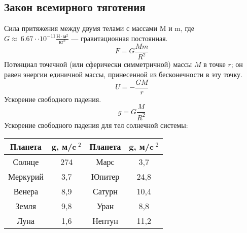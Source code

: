 \subsection{Закон всемирного тяготения}
Сила притяжения между двумя телами с массами M и m, где $G\approx\ 6.67\cdot \cdot10^{-11}\frac{\text{Н}\cdot \text{м}^2}{\text{кг}^2}$ --- гравитационная постоянная.$$F=G\frac{Mm}{R^2}$$
Потенциал точечной (или сферически симметричной) массы $M$ в точке $r$; он равен энергии единичной массы, принесенной из бесконечности в эту точку.$$U=-\frac{GM}{r}$$
Ускорение свободного падения.$$g=G\frac{M}{R^2}$$
Ускорение свободного падения для тел солнечной системы:
\begin{table}[h!]
\centering
\begin{tabular}{|c|c|c|c|}
\hline 
\textbf{Планета} & $\mathbf{g}$, \textbf{м/c$~^2$} & \textbf{Планета} & $\mathbf{g}$, \textbf{м/c$~^2$}\\
\hline
Солнце & 274 & Марс & 3,7\\
\hline
Меркурий & 3,7 & Юпитер & 24,8\\
\hline
Венера & 8,9 & Сатурн & 10,4\\
\hline
Земля & 9,8 & Уран & 8,8\\
\hline
Луна & 1,6 & Нептун & 11,2\\
\hline
\end{tabular}
\end{table}